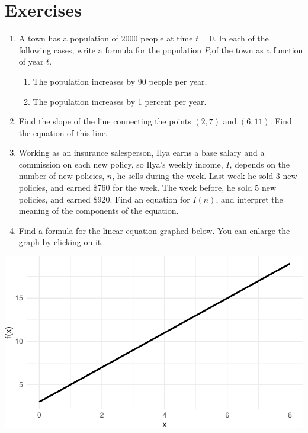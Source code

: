 \documentclass[
  letterpaper,
  DIV=11,
  numbers=noendperiod]{scrreprt}
\providecommand{\tightlist}{%
  \setlength{\itemsep}{0pt}\setlength{\parskip}{0pt}}\usepackage{longtable,booktabs,array}
\begin{document}
\hypertarget{exercises-1}{%
\section{Exercises}\label{exercises-1}}

\begin{enumerate}
\def\labelenumi{\arabic{enumi}.}
\item
  A town has a population of \(2000\) people at time \(t=0\). In each of
  the following cases, write a formula for the population \(P\),of the
  town as a function of year \(t\).

  \begin{enumerate}
  \def\labelenumii{\alph{enumii}.}
  \tightlist
  \item
    The population increases by 90 people per year.
  \item
    The population increases by 1 percent per year.
  \end{enumerate}
\item
  Find the slope of the line connecting the points \((2,7)\) and
  \((6,11)\). Find the equation of this line.
\item
  Working as an insurance salesperson, Ilya earns a base salary and a
  commission on each new policy, so Ilya's weekly income, \(I\), depends
  on the number of new policies, \(n\), he sells during the week. Last
  week he sold 3 new policies, and earned \$760 for the week. The week
  before, he sold 5 new policies, and earned \$920. Find an equation for
  \(I(n)\), and interpret the meaning of the components of the equation.
\item
  Find a formula for the linear equation graphed below. You can enlarge
  the graph by clicking on it.
\end{enumerate}

\includegraphics{ROC_files/figure-pdf/unnamed-chunk-1-1.pdf}
\end{document}
